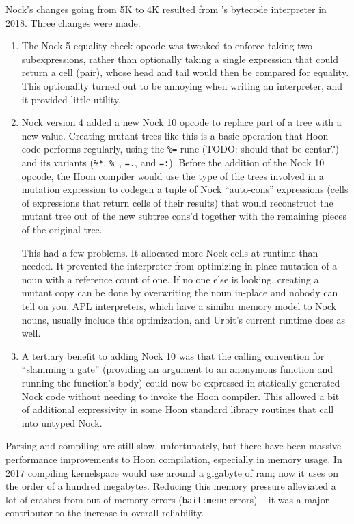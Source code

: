 \documentclass[twoside]{article}
\begin{document}
Nock's changes going from 5K to 4K resulted from 's bytecode interpreter in 2018.  Three changes were made:

\begin{enumerate}
  \item  The Nock 5 equality check opcode was tweaked to enforce taking two subexpressions, rather than optionally taking a single expression that could return a cell (pair), whose head and tail would then be compared for equality.  This optionality turned out to be annoying when writing an interpreter, and it provided little utility.
  \item  Nock version 4 added a new Nock 10 opcode to replace part of a tree with a new value.  Creating mutant trees like this is a basic operation that Hoon code performs regularly, using the \lstinline[style=inlinecode]{%=} rune (TODO: should that be centar?) and its variants (\lstinline[style=inlinecode]{%*}, \lstinline[style=inlinecode]{%_}, \lstinline[style=inlinecode]{=.}, and \lstinline[style=inlinecode]{=:}).  Before the addition of the Nock 10 opcode, the Hoon compiler would use the type of the trees involved in a mutation expression to codegen a tuple of Nock ``auto-cons'' expressions (cells of expressions that return cells of their results) that would reconstruct the mutant tree out of the new subtree cons'd together with the remaining pieces of the original tree.
  
  This had a few problems.  It allocated more Nock cells at runtime than needed.  It prevented the interpreter from optimizing in-place mutation of a noun with a reference count of one.  If no one else is looking, creating a mutant copy can be done by overwriting the noun in-place and nobody can tell on you.  APL interpreters, which have a similar memory model to Nock nouns, usually include this optimization, and Urbit's current runtime does as well.

  \item  A tertiary benefit to adding Nock 10 was that the calling convention for ``slamming a gate'' (providing an argument to an anonymous function and running the function's body) could now be expressed in statically generated Nock code without needing to invoke the Hoon compiler.  This allowed a bit of additional expressivity in some Hoon standard library routines that call into untyped Nock.
\end{enumerate}

Parsing and compiling are still slow, unfortunately, but there have been massive performance improvements to Hoon compilation, especially in memory usage.  In 2017 compiling kernelspace would use around a gigabyte of {\sc ram}; now it uses on the order of a hundred megabytes.  Reducing this memory pressure alleviated a lot of crashes from out-of-memory errors (\lstinline[style=inlinecode]{bail:meme} errors) – it was a major contributor to the increase in overall reliability.
\end{document}
